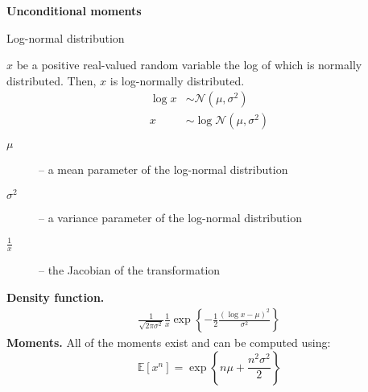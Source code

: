 \documentclass[notes,blackandwhite,mathsans,usenames,dvipsnames]{beamer}
\begin{document}
{
\begin{frame}

\begin{adjustwidth}{-0.5cm}{0cm}
\vspace{8.3cm}\Large
\textbf{{\color{mcxs2}Unconditional} {\color{purple}moments} }
\end{adjustwidth}

\end{frame}
}



\begin{frame}{Log-normal distribution}

 $x$ {\color{mcxs2}be a positive real-valued random variable the log of which is normally distributed.} {\color{mcxs2}Then,} $x$ {\color{mcxs2}is} {\color{purple}log-normally distributed}.
\begin{align*}
\log x &\sim\mathcal{N}\left(\mu, \sigma^2\right)\\[1ex]
x &\sim\log\mathcal{N}\left(\mu, \sigma^2\right)
\end{align*}
\begin{description}
\item[$\mu$] {\color{mcxs2}-- a mean parameter of the log-normal distribution}
\item[$\sigma^2$] {\color{mcxs2}-- a variance parameter of the log-normal distribution}
\item[$\frac{1}{x}$] {\color{mcxs2}-- the Jacobian of the transformation}
\end{description}

\bigskip\textbf{Density function.}
\begin{align*}
\frac{1}{\sqrt{2\pi\sigma^2}}\frac{1}{x}\exp\left\{ -\frac{1}{2}\frac{(\log x - \mu)^2}{\sigma^2} \right\}
\end{align*}
\textbf{Moments.} {\color{mcxs2}All of the moments exist and can be computed using:}
$$ \mathbb{E}[x^n]=\exp\left\{ n\mu+\frac{n^2\sigma^2}{2} \right\} $$

\end{frame}
\end{document}
